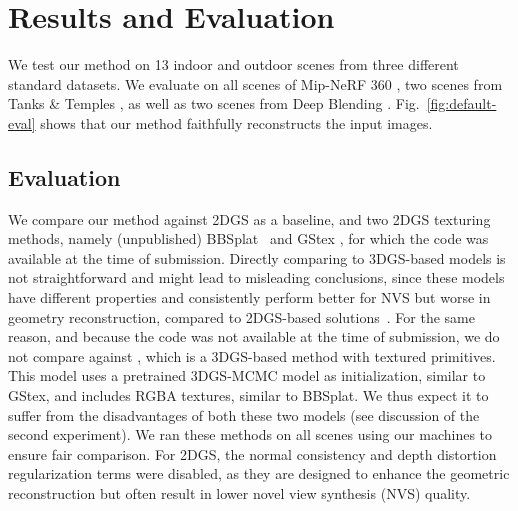 
\section{Results and Evaluation}

We test our method on 13 indoor and outdoor scenes from three different standard datasets.
We evaluate on all scenes of Mip-NeRF 360 \cite{mipnerf360},
two scenes from Tanks \& Temples \cite{tnt},
as well as two scenes from Deep Blending \cite{db}.
Fig.~\ref{fig:default-eval} shows that our method faithfully reconstructs the input images.

\subsection{Evaluation}
\label{sec:eval}

We compare our method against 2DGS \cite{2dgs} as a baseline,
and two 2DGS texturing methods,
namely (unpublished) BBSplat~\cite{bbsplat} and GStex \cite{gstex},
for which the code was available at the time of submission.
{
Directly comparing to 3DGS-based models is not straightforward and might lead to misleading conclusions,
since these models have different properties and consistently perform better for NVS but worse in geometry reconstruction,
compared to 2DGS-based solutions~\cite{2dgs}.
For the same reason,
and because the code was not available at the time of submission,
we do not compare against \cite{textured3dgs},
which is a 3DGS-based method with textured primitives.
This model uses a pretrained 3DGS-MCMC model as initialization,
similar to GStex,
and includes RGBA textures,
similar to BBSplat.
We thus expect it to suffer from the disadvantages of both these two models (see discussion of the second experiment).
}
We ran these methods on all scenes using our machines to ensure fair comparison.
For 2DGS,
the normal consistency and depth distortion regularization terms were disabled,
as they are designed to enhance the geometric reconstruction
but often result in lower novel view synthesis (NVS) quality.

